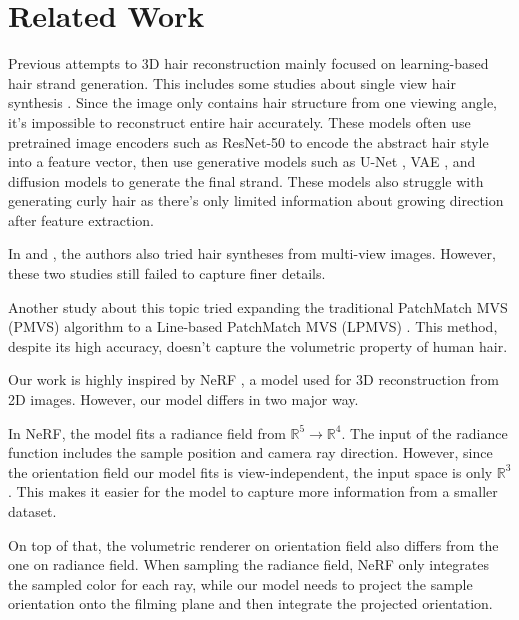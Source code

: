 \documentclass[12pt]{article}
\begin{document}
\section{Related Work}

Previous attempts to 3D hair reconstruction mainly focused on learning-based hair strand generation. This includes some studies about single view hair synthesis \cite{saito_3d_2018, zheng_hairstep_2023, wu_neuralhdhair_2022, ma_single-view_nodate}. Since the image only contains hair structure from one viewing angle, it's impossible to reconstruct entire hair accurately. These models often use pretrained image encoders such as ResNet-50 \cite{saito_3d_2018} to encode the abstract hair style into a feature vector, then use generative models such as U-Net \cite{zheng_hairstep_2023}, VAE \cite{saito_3d_2018}, and diffusion models \cite{sklyarova_neural_2023} to generate the final strand. These models also struggle with generating curly hair as there's only limited information about growing direction after feature extraction.

In \cite{sklyarova_neural_2023} and \cite{rosu_neural_2022}, the authors also tried hair syntheses from multi-view images. However, these two studies still failed to capture finer details.

Another study about this topic tried expanding the traditional PatchMatch MVS (PMVS) algorithm to a Line-based PatchMatch MVS (LPMVS) \cite{nam_strand-accurate_nodate}. This method, despite its high accuracy, doesn't capture the volumetric property of human hair.

Our work is highly inspired by NeRF \cite{mildenhall_nerf_2020}, a model used for 3D reconstruction from 2D images. However, our model differs in two major way.

In NeRF, the model fits a radiance field from $\mathbb{R}^{5} \rightarrow \mathbb{R}^{4}$. The input of the radiance function includes the sample position and camera ray direction. However, since the orientation field our model fits is view-independent, the input space is only $\mathbb{R}^{3}$. This makes it easier for the model to capture more information from a smaller dataset.

On top of that, the volumetric renderer on orientation field also differs from the one on radiance field. When sampling the radiance field, NeRF only integrates the sampled color for each ray, while our model needs to project the sample orientation onto the filming plane and then integrate the projected orientation.
\end{document}
